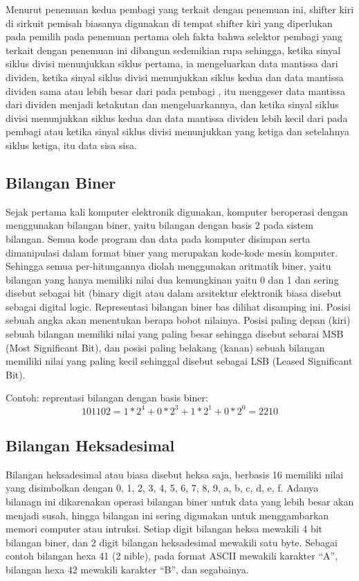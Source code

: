 Menurut penemuan kedua pembagi yang terkait dengan penemuan ini, shifter kiri di sirkuit pemisah biasanya digunakan di tempat shifter kiri yang diperlukan pada pemilih pada penemuan pertama oleh fakta bahwa selektor pembagi yang terkait dengan penemuan ini dibangun sedemikian rupa sehingga, 
ketika sinyal siklus divisi menunjukkan siklus pertama, ia mengeluarkan data mantissa dari dividen, ketika sinyal siklus divisi menunjukkan siklus kedua dan data mantissa dividen sama atau lebih besar dari pada pembagi , 
itu menggeser data mantissa dari dividen menjadi ketakutan dan mengeluarkannya, dan ketika sinyal siklus divisi menunjukkan siklus kedua dan data mantissa dividen lebih kecil dari pada pembagi atau ketika sinyal siklus divisi menunjukkan yang ketiga dan setelahnya siklus ketiga, itu data sisa sisa.

\subsection{Bilangan Biner}
Sejak pertama kali komputer elektronik digunakan, komputer beroperasi dengan menggunakan bilangan biner, yaitu bilangan dengan basis 2 pada sistem bilangan. Semua kode program dan data pada komputer disimpan serta dimanipulasi dalam format biner yang merupakan kode-kode mesin komputer. Sehingga semua per-hitungannya diolah menggunakan aritmatik biner, yaitu bilangan yang hanya memiliki nilai dua kemungkinan yaitu 0 dan 1 dan sering disebut sebagai bit (binary digit atau dalam arsitektur elektronik biasa disebut sebagai digital logic. Representasi bilangan biner bas dilihat disamping ini. Posisi sebuah angka akan menentukan berapa bobot nilainya. Posisi paling depan (kiri) sebuah bilangan memiliki nilai yang paling besar sehingga disebut sebarai MSB (Most Significant Bit), dan posisi paling belakang (kanan) sebuah bilangan memiliki nilai yang paling kecil sehinggal disebut sebagai LSB (Leased Significant Bit).

Contoh: reprentasi bilangan dengan basis biner:
\begin{equation}
101102 = 1*2^4 + 0*2^3+1*2^1+0*2^0=2210
\end{equation}

\subsection{Bilangan Heksadesimal}
Bilangan heksadesimal atau biasa disebut heksa saja, berbasis 16 memiliki nilai yang disimbolkan dengan 0, 1, 2, 3, 4, 5, 6, 7, 8, 9, a, b, c, d, e, f. Adanya bilanagn ini dikarenakan operasi bilangan biner untuk data yang lebih besar akan menjadi susah, hingga bilangan ini sering digunakan untuk menggambarkan memori computer atau intruksi. Setiap digit bilangan heksa mewakili 4 bit bilangan biner, dan 2 digit bilangan heksadesimal mewakili satu byte.
Sebagai contoh bilangan hexa 41 (2 nible), pada format ASCII mewakili karakter “A”, bilangan hexa 42 mewakili karakter “B”, dan segabainya.

